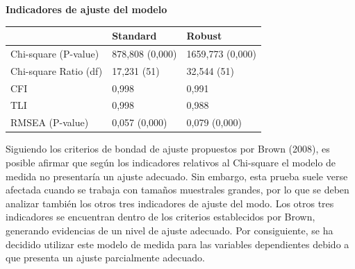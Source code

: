 \documentclass[12pt,twoside]{templates/facsothesis}
\newenvironment{Shaded}{\begin{snugshade}}{\end{snugshade}}
\newcommand{\DataTypeTok}[1]{\textcolor[rgb]{0.13,0.29,0.53}{#1}}
\newcommand{\KeywordTok}[1]{\textcolor[rgb]{0.13,0.29,0.53}{\textbf{#1}}}
\newcommand{\NormalTok}[1]{#1}
\newcommand{\OperatorTok}[1]{\textcolor[rgb]{0.81,0.36,0.00}{\textbf{#1}}}
\newcommand{\StringTok}[1]{\textcolor[rgb]{0.31,0.60,0.02}{#1}}
\begin{document}
\begin{Shaded}
\end{Shaded}

\textbf{Indicadores de ajuste del modelo}

\begin{longtable}[]{@{}lll@{}}
\toprule
& Standard & Robust\tabularnewline
\midrule
\endhead
Chi-square (P-value) & 878,808 (0,000) & 1659,773 (0,000)\tabularnewline
Chi-square Ratio (df) & 17,231 (51) & 32,544 (51)\tabularnewline
CFI & 0,998 & 0,991\tabularnewline
TLI & 0,998 & 0,988\tabularnewline
RMSEA (P-value) & 0,057 (0,000) & 0,079 (0,000)\tabularnewline
\bottomrule
\end{longtable}

Siguiendo los criterios de bondad de ajuste propuestos por Brown (2008), es posible afirmar que según los indicadores relativos al Chi-square el modelo de medida no presentaría un ajuste adecuado. Sin embargo, esta prueba suele verse afectada cuando se trabaja con tamaños muestrales grandes, por lo que se deben analizar también los otros tres indicadores de ajuste del modo. Los otros tres indicadores se encuentran dentro de los criterios establecidos por Brown, generando evidencias de un nivel de ajuste adecuado. Por consiguiente, se ha decidido utilizar este modelo de medida para las variables dependientes debido a que presenta un ajuste parcialmente adecuado.
\end{document}
